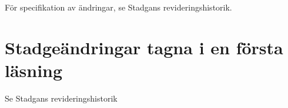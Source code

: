 \documentclass[10pt]{article}
\begin{document}
    För specifikation av ändringar, se Stadgans revideringshistorik.
    
    \section*{Stadgeändringar tagna i en första läsning}
    
    Se Stadgans revideringshistorik
    
    
\end{document}
